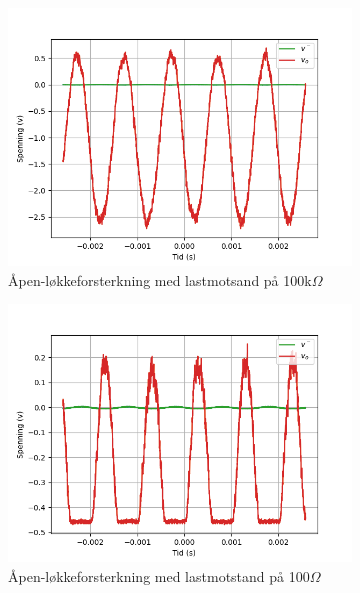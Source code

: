     \begin{figure}[H]
        \centering
        \begin{subfigure}{.5\textwidth}
            \centering
            \includegraphics[width=1\linewidth]{./Images/03Research/åpenløkkeplain100kohm.png}
            \caption{Åpen-løkkeforsterkning med lastmotsand på 100k{$\Omega$}}
            \label{fig:100k}
        \end{subfigure}%
        \begin{subfigure}{.5\textwidth}
            \centering
            \includegraphics[width=1\linewidth]{./Images/03Research/åpenløkkeplain100ohm.png}
            \caption{Åpen-løkkeforsterkning med lastmotstand på 100{$\Omega$}}
            \label{fig:100}
        \end{subfigure}
        \caption{}
        \label{fig:åpenløkker}
    \end{figure}

